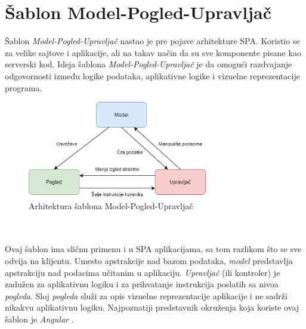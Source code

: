 \documentclass[12pt,oneside]{memoir}
\begin{document}
\section{Šablon Model-Pogled-Upravljač}

Šablon \emph{Model-Pogled-Upravljač} nastao je pre pojave arhitekture SPA.
Koristio se za velike sajtove i aplikacije, ali na takav način da su sve komponente pisane
kao serverski kod. Ideja šablona \emph{Model-Pogled-Upravljač} je da omogući razdvajanje odgovornosti
između logike podataka, aplikativne logike i vizuelne reprezentacije programa.
\begin{figure}[!ht]
  \centering
  \includegraphics[width=0.7\textwidth]{slike/MVC_pattern (1).png}
  \caption{Arhitektura šablona Model-Pogled-Upravljač}
  \label{fig:MVC}
\end{figure}
\\
\\
Ovaj šablon ima sličnu primenu i u SPA aplikacijama, sa tom razlikom što se sve odvija na klijentu.
Umesto apstrakcije nad bazom podataka, \emph{model} predstavlja apstrakciju nad podacima učitanim
u aplikaciju. \emph{Upravljač} (ili kontroler) je zadužen za aplikativnu logiku i za prihvatanje
instrukcija poslatih sa nivoa \emph{pogleda}. Sloj \emph{pogleda} služi za opis vizuelne
reprezentacije aplikacije i ne sadrži nikakvu aplikativnu logiku. Najpoznatiji predstavnik okruženja
koja koriste ovaj šablon je \emph{Angular} \cite{Angular}.
\end{document}
